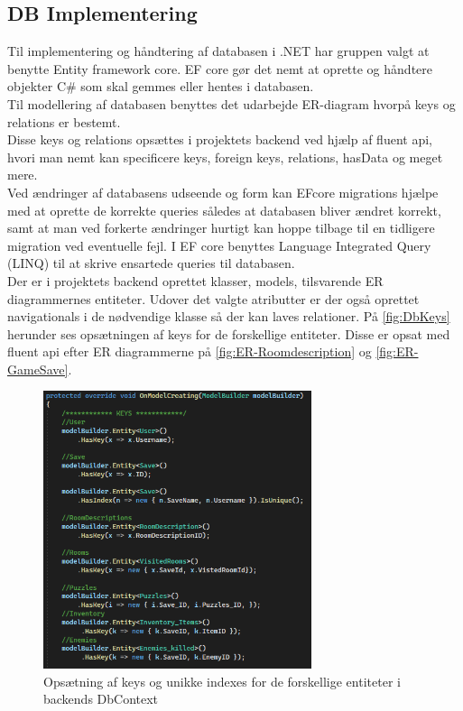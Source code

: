 \subsection{DB Implementering}
\label{Section: DB-Implementering}
Til implementering og håndtering af databasen i .NET har gruppen valgt at benytte Entity framework core.
EF core gør det nemt at oprette og håndtere objekter C\# som skal gemmes eller hentes i databasen.\\
Til modellering af databasen benyttes det udarbejde ER-diagram hvorpå keys og relations er bestemt.\\
Disse keys og relations opsættes i projektets backend ved hjælp af fluent api, hvori man nemt kan specificere keys, foreign keys, relations, hasData og meget mere.\\
Ved ændringer af databasens udseende og form kan EFcore migrations hjælpe med at oprette de korrekte queries således at databasen bliver ændret korrekt, samt at man ved forkerte ændringer hurtigt kan hoppe tilbage til en tidligere migration ved eventuelle fejl. I EF core benyttes Language Integrated Query (LINQ) til at skrive ensartede queries til databasen.\\

Der er i projektets backend oprettet klasser, models, tilsvarende ER diagrammernes entiteter. Udover det valgte atributter er der også oprettet navigationals i de nødvendige klasse så der kan laves relationer.
På \autoref{fig:DbKeys} herunder ses opsætningen af keys for de forskellige entiteter. Disse er opsat med fluent api efter ER diagrammerne på \autoref{fig:ER-Roomdescription} og \autoref{fig:ER-GameSave}.

\begin{figure}[H]
\centering
\includegraphics[width = 0.7\textwidth]{02-Body/Images/DAL-Database/DbKeys.PNG}
\caption{Opsætning af keys og unikke indexes for de forskellige entiteter i backends DbContext}
\label{fig:DbKeys}
\end{figure}

